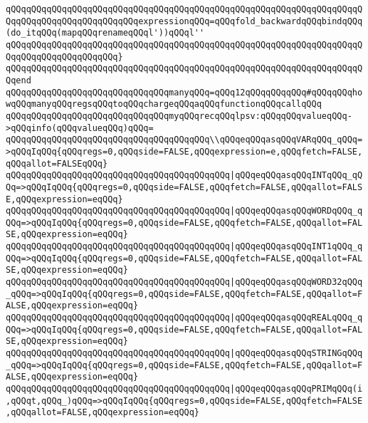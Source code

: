 \verb|qQQqqQQqqQQqqQQqqQQqqQQqqQQqqQQqqQQqqQQqqQQqqQQqqQQqqQQqqQQqqQQqqQQqqQQqqQQqqQQqqQQqqQQqqQQqqQQqexpressionqQQq=qQQqfold_backwardqQQqbindqQQq(do_itqQQq(mapqQQqrenameqQQql'))qQQql''|\newline
\verb|qQQqqQQqqQQqqQQqqQQqqQQqqQQqqQQqqQQqqQQqqQQqqQQqqQQqqQQqqQQqqQQqqQQqqQQqqQQqqQQqqQQqqQQqqQQq}|\newline
\verb|qQQqqQQqqQQqqQQqqQQqqQQqqQQqqQQqqQQqqQQqqQQqqQQqqQQqqQQqqQQqqQQqqQQqqQQqend|\newline
\newline
\verb|qQQqqQQqqQQqqQQqqQQqqQQqqQQqqQQqmanyqQQq=qQQq12qQQqqQQqqQQq#qQQqqQQqhowqQQqmanyqQQqregsqQQqtoqQQqchargeqQQqaqQQqfunctionqQQqcallqQQq|\newline
\newline
\verb|qQQqqQQqqQQqqQQqqQQqqQQqqQQqqQQqmyqQQqrecqQQqlpsv:qQQqqQQqvalueqQQq->qQQqinfo(qQQqvalueqQQq)qQQq=|\newline
\verb|qQQqqQQqqQQqqQQqqQQqqQQqqQQqqQQqqQQqqQQq\\qQQqeqQQqasqQQqVARqQQq_qQQq=>qQQqIqQQq{qQQqregs=0,qQQqside=FALSE,qQQqexpression=e,qQQqfetch=FALSE,qQQqallot=FALSEqQQq}|\newline
\verb|qQQqqQQqqQQqqQQqqQQqqQQqqQQqqQQqqQQqqQQqqQQq|\verb#|qQQqeqQQqasqQQqINTqQQq_qQQq=>qQQqIqQQq{qQQqregs=0,qQQqside=FALSE,qQQqfetch=FALSE,qQQqallot=FALSE,qQQqexpression=eqQQq}#\newline
\verb|qQQqqQQqqQQqqQQqqQQqqQQqqQQqqQQqqQQqqQQqqQQq|\verb#|qQQqeqQQqasqQQqWORDqQQq_qQQq=>qQQqIqQQq{qQQqregs=0,qQQqside=FALSE,qQQqfetch=FALSE,qQQqallot=FALSE,qQQqexpression=eqQQq}#\newline
\verb|qQQqqQQqqQQqqQQqqQQqqQQqqQQqqQQqqQQqqQQqqQQq|\verb#|qQQqeqQQqasqQQqINT1qQQq_qQQq=>qQQqIqQQq{qQQqregs=0,qQQqside=FALSE,qQQqfetch=FALSE,qQQqallot=FALSE,qQQqexpression=eqQQq}#\newline
\verb|qQQqqQQqqQQqqQQqqQQqqQQqqQQqqQQqqQQqqQQqqQQq|\verb#|qQQqeqQQqasqQQqWORD32qQQq_qQQq=>qQQqIqQQq{qQQqregs=0,qQQqside=FALSE,qQQqfetch=FALSE,qQQqallot=FALSE,qQQqexpression=eqQQq}#\newline
\verb|qQQqqQQqqQQqqQQqqQQqqQQqqQQqqQQqqQQqqQQqqQQq|\verb#|qQQqeqQQqasqQQqREALqQQq_qQQq=>qQQqIqQQq{qQQqregs=0,qQQqside=FALSE,qQQqfetch=FALSE,qQQqallot=FALSE,qQQqexpression=eqQQq}#\newline
\verb|qQQqqQQqqQQqqQQqqQQqqQQqqQQqqQQqqQQqqQQqqQQq|\verb#|qQQqeqQQqasqQQqSTRINGqQQq_qQQq=>qQQqIqQQq{qQQqregs=0,qQQqside=FALSE,qQQqfetch=FALSE,qQQqallot=FALSE,qQQqexpression=eqQQq}#\newline
\verb|qQQqqQQqqQQqqQQqqQQqqQQqqQQqqQQqqQQqqQQqqQQq|\verb#|qQQqeqQQqasqQQqPRIMqQQq(i,qQQqt,qQQq_)qQQq=>qQQqIqQQq{qQQqregs=0,qQQqside=FALSE,qQQqfetch=FALSE,qQQqallot=FALSE,qQQqexpression=eqQQq}#\newline
